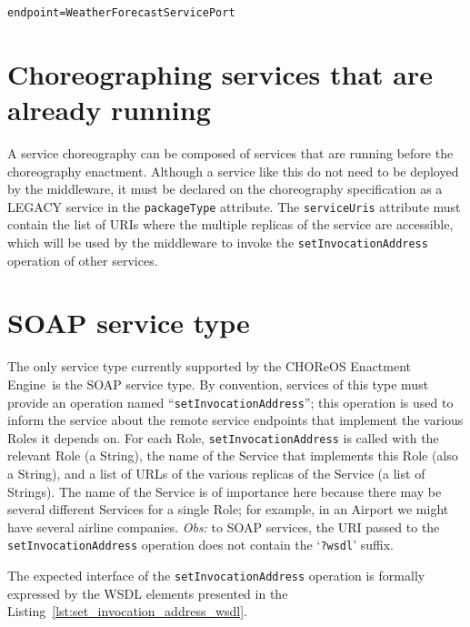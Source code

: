 \documentclass[a4paper, 10pt]{article}
\newcommand{\ee}{CHOReOS Enactment Engine}
\begin{document}
{\footnotesize
\begin{lstlisting}[caption=LTS file of a simple coordination delegate that acts as a proxy, label=lst:weather_lts] 
endpoint=WeatherForecastServicePort
\end{lstlisting}
}

\section{Choreographing services that are already running}

A service choreography can be composed of services that are running before the choreography enactment. Although a service like this do not need to be deployed by the middleware, it must be declared on the choreography specification as a LEGACY 	service in the \texttt{packageType} attribute. The \texttt{serviceUris} attribute must contain the list of URIs where the multiple replicas of the service are accessible, which will be used by the middleware to invoke the \texttt{setInvocationAddress} operation of other services. 

\section{SOAP service type}

The only service type currently supported by the \ee\ is the SOAP service type. By convention, services of this type must provide an operation named ``\texttt{setInvocationAddress}''; this operation is used to inform the service about the remote service endpoints that implement the various Roles it depends on. For each Role, \texttt{setInvocationAddress} is called with the relevant Role (a String), the name of the Service that implements this Role (also a String), and a list of URLs of the various replicas of the Service (a list of Strings). The name of the Service is of importance here because there may be several different Services for a single Role; for example, in an Airport we might have several airline companies. \emph{Obs:} to SOAP services, the URI passed to the \texttt{setInvocationAddress} operation does not contain the `\texttt{?wsdl}' suffix.

The expected interface of the \texttt{setInvocationAddress} operation is formally expressed by the WSDL elements presented in the Listing~\ref{lst:set_invocation_address_wsdl}. 
\end{document}
